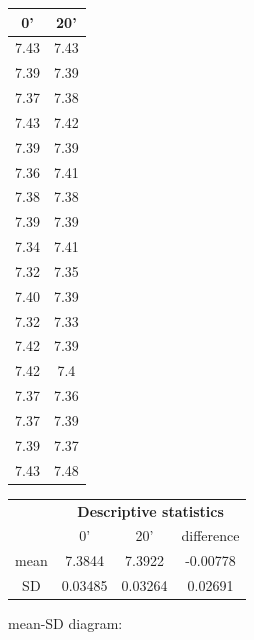	\begin{minipage}{0.2\textwidth}
	\flushright
		\begin{tabular}{cc}
		\toprule
		0’&20’\\
		\midrule
		7.43&7.43\\
		7.39&7.39\\
		7.37&7.38\\
		7.43&7.42\\
		7.39&7.39\\
		7.36&7.41\\
		7.38&7.38\\
		7.39&7.39\\
		7.34&7.41\\
		7.32&7.35\\
		7.40&7.39\\
		7.32&7.33\\
		7.42&7.39\\
		7.42&7.4\\
		7.37&7.36\\
		7.37&7.39\\
		7.39&7.37\\
		7.43&7.48\\
		\bottomrule
		\end{tabular}
	\end{minipage}
	\begin{minipage}{0.7\textwidth}
		\centering
		\begin{tabular}{cccc}
		\toprule
		& \multicolumn{3}{c}{\textbf{Descriptive statistics}}	\\
		
				& 0’		& 20’ 		& difference\\
			\midrule
		mean 	& 7.3844	& 7.3922	& -0.00778\\
		SD		& 0.03485	& 0.03264	& 0.02691\\
		\bottomrule
		\end{tabular}\bigskip		
		
		mean-SD diagram: 
		
		\vspace{12em}
	\end{minipage}	
		
